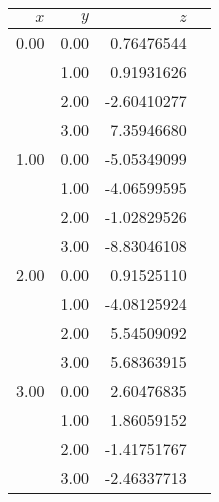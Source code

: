 \begin{tabular}{rrrr}
\toprule
$x$&
$y$&
$z$\\
\midrule
0.00 & 0.00 & 0.76476544\\
 & 1.00 & 0.91931626\\
 & 2.00 & -2.60410277\\
 & 3.00 & 7.35946680\\
\midrule
1.00 & 0.00 & -5.05349099\\
 & 1.00 & -4.06599595\\
 & 2.00 & -1.02829526\\
 & 3.00 & -8.83046108\\
\midrule
2.00 & 0.00 & 0.91525110\\
 & 1.00 & -4.08125924\\
 & 2.00 & 5.54509092\\
 & 3.00 & 5.68363915\\
\midrule
3.00 & 0.00 & 2.60476835\\
 & 1.00 & 1.86059152\\
 & 2.00 & -1.41751767\\
 & 3.00 & -2.46337713\\
\bottomrule
\end{tabular}
